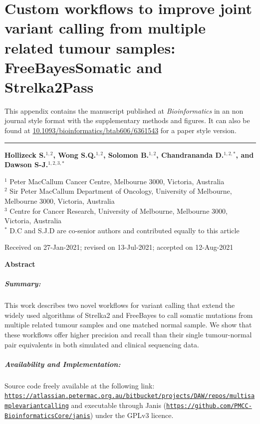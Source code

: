 \chapter[Strelka2Pass and FreeBayesSomatic publication]{Custom workflows to improve joint variant calling from multiple related tumour samples: FreeBayesSomatic and Strelka2Pass}
\label{ch:appendixManuscript}

This appendix contains the manuscript published at \textit{Bioinformatics} in an non journal style format with the supplementary methods and figures. It can also be found at \href{https://doi.org/10.1093/bioinformatics/btab606/6361543}{10.1093/bioinformatics/btab606/6361543} for a paper style version.
\vspace{1em}
\hrule
\vspace{2em}

{\Large \textbf{Hollizeck S.$^{1,2}$, Wong S.Q.$^{1,2}$, Solomon B.$^{1,2}$, Chandrananda D.$^{1,2,*}$, and Dawson S-J.$^{1,2,3,*}$}}

{
$^1$ Peter MacCallum Cancer Centre, Melbourne 3000, Victoria, Australia\\
$^2$ Sir Peter MacCallum Department of Oncology, University of Melbourne, Melbourne 3000, Victoria, Australia\\
$^3$ Centre for Cancer Research, University of Melbourne, Melbourne 3000, Victoria, Australia\\
\vspace{0.5em}
$^*$ D.C and S.J.D are co-senior authors and contributed equally to this article
}

{\small
Received on 27-Jan-2021; revised on 13-Jul-2021; accepted on 12-Aug-2021
}

{\Large \textbf{Abstract}}
\vspace{-2em}
\paragraph*{\textbf{Summary:}} This work describes two novel workflows for variant calling that extend the widely used algorithms of Strelka2 and FreeBayes to call somatic mutations from multiple related tumour samples and one matched normal sample. We show that these workflows offer higher precision and recall than their single tumour-normal pair equivalents in both simulated and clinical sequencing data.
\vspace{-2em}
\paragraph*{\textbf{Availability and Implementation:}} Source code freely available at the following link:
\href{https://atlassian.petermac.org.au/bitbucket/projects/DAW/repos/multisamplevariantcalling}{\nolinkurl{https://atlassian.petermac.org.au/bitbucket/projects/DAW/repos/multisamplevariantcalling}}
and executable through Janis (\href{https://github.com/PMCC-BioinformaticsCore/janis}{\nolinkurl{https://github.com/PMCC-BioinformaticsCore/janis}}) under the GPLv3 licence.
\vspace{-2em}
